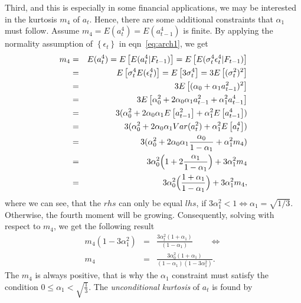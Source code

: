 \documentclass[a4paper,11pt,english]{article}
\begin{document}
			Third, and this is especially in some financial applications, we may be interested in the kurtosis $m_4$ of $a_t$.
			Hence, there are some additional constraints that $\alpha_1$ must follow. Assume $m_4 = E(a_t^4) = E(a_{t-1}^4)$ 
			is finite. By applying the normality assumption of $\left\{ \epsilon_t \right\}$ in eqn~\ref{eq:arch1}, we get
			\begin{eqnarray*}
				m_4 &=& E(a_t^4) = E\left[E(a^4_t | F_{t-1}) \right] =  E\left[E(\sigma^4_t \epsilon^4_t | F_{t-1})\right]         \\
				 &=& E\left[\sigma^4_t E(\epsilon^4_t ) \right] = E\left[3 \sigma^4_t \right] = 3 E\left[ (\sigma^2_t)^2 \right]   \\ 
 				 &=& 3 E\left[ (\alpha_0 + \alpha_1 a^2_{t-1})^2 \right]                                                           \\
				 &=& 3 E\left[ \alpha_0^2 + 2 \alpha_0 \alpha_1 a^2_{t-1} + \alpha_1^2 a^4_{t-1} \right]                           \\
				 &=& 3 (\alpha_0^2 + 2 \alpha_0 \alpha_1 E\left[a^2_{t-1}\right]  + \alpha_1^2 E\left[a^4_{t-1}\right] )           \\
				 &=& 3 (\alpha_0^2 + 2 \alpha_0 \alpha_1 Var(a^2_t) + \alpha_1^2 E\left[a^4_t\right])                              \\
				 &=& 3 (\alpha_0^2 + 2 \alpha_0 \alpha_1 \frac{\alpha_0}{1-\alpha_1} + \alpha_1^2 m_4)                             \\
				 &=& 3 \alpha_0^2\Bigl(1 + 2  \frac{\alpha_1}{1-\alpha_1}\Bigr) + 3\alpha_1^2 m_4                              	   \\
				 &=& 3 \alpha_0^2\Bigl(\frac{1+\alpha_1}{1-\alpha_1}\Bigr) + 3\alpha_1^2 m_4,
			\end{eqnarray*}
			where we can see, that the $rhs$ can only be equal $lhs$, if $3 \alpha_1^2 < 1 \Leftrightarrow \alpha_1 = \sqrt{1/3}$. Otherwise, the fourth 
			moment will be growing. Consequently, solving with respect to $m_4$, we get the following result
			\begin{eqnarray*}
				m_4 (1 - 3 \alpha_1^2) &=&  \frac{3 \alpha_t^2 (1+\alpha_1)}{(1-\alpha_1)}\text{ }\text{ }\text{ } \Leftrightarrow  \\
				m_4 &=& \frac{3 \alpha_0^2(1+\alpha_1)}{(1-\alpha_1)(1 - 3\alpha^2_1)}. 
			\end{eqnarray*}
			The $m_4$ is always positive, that is why the $\alpha_1$ constraint must satisfy the condition $0 \leq \alpha_1 < \sqrt{\frac{1}{3}}$. 			
			The \emph{unconditional kurtosis} of $a_t$ is found by
\end{document}
